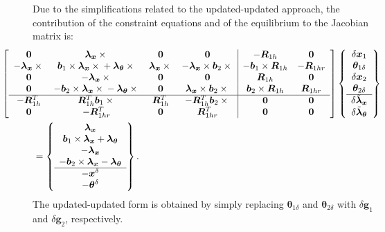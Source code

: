 \documentclass[10pt,dvips,fleqn,subeqn]{report}
\newcommand{\T}[1]{\bm{#1}}
\begin{document}
Due to the simplifications related to the updated-updated approach,
the contribution of the constraint equations and of the equilibrium 
to the Jacobian matrix is: 
\begin{align}
	\small
	&\hspace{-12mm}%
	\sqbr{\matr{cccc|cc}{
	\T{0} & 
	\T{\lambda}_{\T{x}}\times{} & 
	\T{0} & 
	\T{0} & 
	-\T{R}_{1h} &
	\T{0} \\
	-\T{\lambda}_{\T{x}}\times{} & 
	\T{b}_1\times\T{\lambda}_{\T{x}}\times{} + \T{\lambda}_{\T{\theta}}\times{} &
	\T{\lambda}_{\T{x}}\times{} & 
	-\T{\lambda}_{\T{x}}\times\T{b}_2\times{} & 
	-\T{b}_1\times\T{R}_{1h} &
	-\T{R}_{1hr} \\
	\T{0} & 
	-\T{\lambda}_{\T{x}}\times{} &
	\T{0} &
	\T{0} &
	\T{R}_{1h} &
	\T{0} \\
	\T{0} & 
	-\T{b}_2\times\T{\lambda}_{\T{x}}\times{} - \T{\lambda}_{\T{\theta}}\times{} &
	\T{0} &
	\T{\lambda}_{\T{x}}\times\T{b}_2\times{} &
	\T{b}_2\times\T{R}_{1h} & 
	\T{R}_{1hr} \\
	\hline
	-\T{R}_{1h}^T &
	\T{R}_{1h}^T\T{b}_1\times{} & 
	\T{R}_{1h}^T &
	-\T{R}_{1h}^T\T{b}_2\times{} & 
	\T{0} &
	\T{0} \\
	\T{0} &
	-\T{R}_{1hr}^T &
	\T{0} &
	\T{R}_{1hr}^T &
	\T{0} & 
	\T{0}
	}} \cubr{\cvvect{
		\delta\T{x}_1 \\
		\T{\theta}_{1\delta} \\
		\delta\T{x}_2 \\
		\T{\theta}_{2\delta} \\
		\hline
		\delta\tilde{\T{\lambda}}_{\T{x}} \\
		\delta\tilde{\T{\lambda}}_{\T{\theta}}
	}} \nonumber \\
	&= \cubr{\cvvect{
	\T{\lambda}_{\T{x}} \\
	\T{b}_1 \times \T{\lambda}_{\T{x}} + \T{\lambda}_{\T{\theta}} \\
	- \T{\lambda}_{\T{x}} \\
	- \T{b}_2 \times \T{\lambda}_{\T{x}} - \T{\lambda}_{\T{\theta}} \\
	\hline
	- \T{x}^{\delta} \\
	- \T{\theta}^{\delta}
	}} .
\end{align}
The updated-updated form is obtained by simply replacing
$\T{\theta}_{1\delta}$ and $\T{\theta}_{2\delta}$
with $\delta\T{g}_1$ and $\delta\T{g}_2$, respectively.
\end{document}
